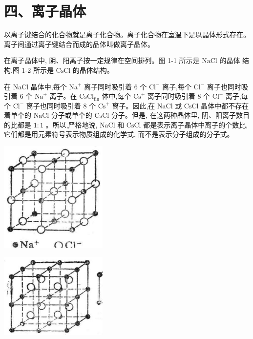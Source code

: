 \documentclass[10pt]{article}
\begin{document}
\section*{四、离子晶体}

以离子键结合的化合物就是离子化合物。离子化合物在室温下是以晶体形式存在。离子间通过离子键结合而成的品体叫做离子晶体。

在离子晶体中, 阴、阳离子按一定规律在空间排列。图 1-1 所示是 \(\mathrm{{NaCl}}\) 的晶体 结构,图 1-2 所示是 \(\mathrm{{CsCl}}\) 的晶体结构。

在 \(\mathrm{{NaCl}}\) 晶体中,每个 \({\mathrm{{Na}}}^{ + }\) 离子同时吸引着 6 个 \({\mathrm{{Cl}}}^{ - }\) 离子,每个 \({\mathrm{{Cl}}}^{ - }\) 离子也同时吸引着 6 个 \({\mathrm{{Na}}}^{ + }\) 离子。在 \({\mathrm{{CsCl}}}_{\mathrm{{fin}}}\) 体中,每个 \({\mathrm{{Cs}}}^{ + }\) 离子同时吸引着 8 个 \({\mathrm{{Cl}}}^{ - }\) 离子,每个 \({\mathrm{{Cl}}}^{ - }\) 离子也同时吸引着 8 个 \({\mathrm{{Cs}}}^{ + }\) 离子。因此,在 \(\mathrm{{NaCl}}\) 或 \(\mathrm{{CsCl}}\) 晶体中都不存在着单个的 \(\mathrm{{NaCl}}\) 分子或单个的 \(\mathrm{{CsCl}}\) 分子。但是, 在这两种晶体里, 阴、阳离子数目的比都是 \(1 : 1\) 。所以,严格地说, \(\mathrm{{NaCl}}\) 和 \(\mathrm{{CsCl}}\) 都是表示离子晶体中离子的个数比,它们都是用元素符号表示物质组成的化学式, 而不是表示分子组成的分子式。

\begin{center}
\includegraphics[max width=0.4\textwidth]{images/01912d13-9986-7822-a012-3f3f7be99dcb_10_571460.jpg}
\end{center}

\begin{center}
\includegraphics[max width=0.4\textwidth]{images/01912d13-9986-7822-a012-3f3f7be99dcb_10_385357.jpg}
\end{center}
\end{document}
